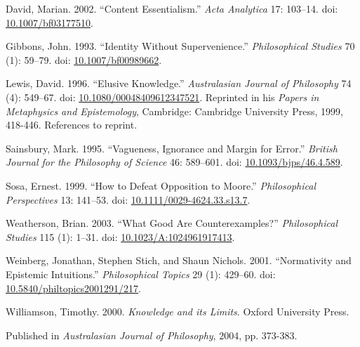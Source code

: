 \documentclass[
  11pt,
  letterpaper,
  DIV=11,
  numbers=noendperiod,
  twoside]{scrartcl}
\newlength{\cslhangindent}
\newenvironment{CSLReferences}[2] %
 {\begin{list}{}{%
  \setlength{\itemindent}{0pt}
  \setlength{\leftmargin}{0pt}
  \setlength{\parsep}{0pt}
  \ifodd #1
   \setlength{\leftmargin}{\cslhangindent}
   \setlength{\itemindent}{-1\cslhangindent}
  \fi
  \setlength{\itemsep}{#2\baselineskip}}}
 {\end{list}}
\begin{document}
\label{refs}
\begin{CSLReferences}{1}{0}
David, Marian. 2002. {``Content Essentialism.''} \emph{Acta Analytica}
17: 103--14. doi:
\href{https://doi.org/10.1007/bf03177510}{10.1007/bf03177510}.

Gibbons, John. 1993. {``Identity Without Supervenience.''}
\emph{Philosophical Studies} 70 (1): 59--79. doi:
\href{https://doi.org/10.1007/bf00989662}{10.1007/bf00989662}.

Lewis, David. 1996. {``Elusive Knowledge.''} \emph{Australasian Journal
of Philosophy} 74 (4): 549--67. doi:
\href{https://doi.org/10.1080/00048409612347521}{10.1080/00048409612347521}.
Reprinted in his \emph{Papers in Metaphysics and Epistemology},
Cambridge: Cambridge University Press, 1999, 418-446. References to
reprint.

Sainsbury, Mark. 1995. {``Vagueness, Ignorance and Margin for Error.''}
\emph{British Journal for the Philosophy of Science} 46: 589--601. doi:
\href{https://doi.org/10.1093/bjps/46.4.589}{10.1093/bjps/46.4.589}.

Sosa, Ernest. 1999. {``How to Defeat Opposition to Moore.''}
\emph{Philosophical Perspectives} 13: 141--53. doi:
\href{https://doi.org/10.1111/0029-4624.33.s13.7}{10.1111/0029-4624.33.s13.7}.

Weatherson, Brian. 2003. {``{What Good Are Counterexamples?}''}
\emph{Philosophical Studies} 115 (1): 1--31. doi:
\href{https://doi.org/10.1023/A:1024961917413}{10.1023/A:1024961917413}.

Weinberg, Jonathan, Stephen Stich, and Shaun Nichols. 2001.
{``Normativity and Epistemic Intuitions.''} \emph{Philosophical Topics}
29 (1): 429--60. doi:
\href{https://doi.org/10.5840/philtopics2001291/217}{10.5840/philtopics2001291/217}.

Williamson, Timothy. 2000. \emph{{Knowledge and its Limits}}. Oxford
University Press.

\end{CSLReferences}



\noindent Published in\emph{
Australasian Journal of Philosophy}, 2004, pp. 373-383.
\end{document}
